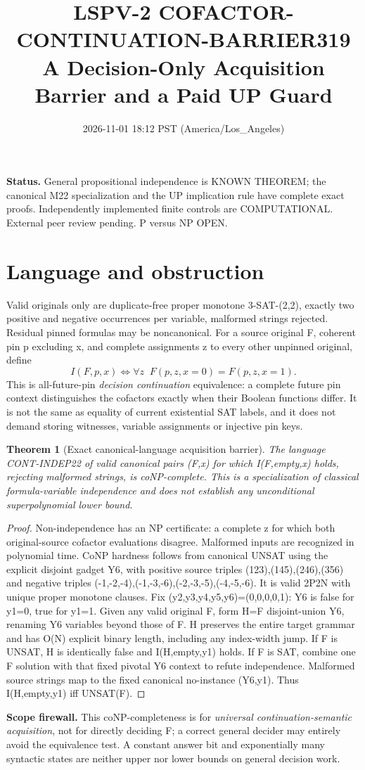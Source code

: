 \documentclass[11pt]{article}
\title{LSPV-2 COFACTOR-CONTINUATION-BARRIER319\\A Decision-Only Acquisition Barrier and a Paid UP Guard}
\date{2026-11-01 18:12 PST (America/Los\_Angeles)}
\newtheorem{theorem}{Theorem}
\begin{document}
\maketitle
\noindent\textbf{Status.} General propositional independence is KNOWN THEOREM; the canonical M22 specialization and the UP implication rule have complete exact proofs. Independently implemented finite controls are COMPUTATIONAL. External peer review pending. P versus NP OPEN.
\section{Language and obstruction}
Valid originals only are duplicate-free proper monotone 3-SAT-(2,2), exactly two positive and negative occurrences per variable, malformed strings rejected. Residual pinned formulas may be noncanonical. For a source original F, coherent pin p excluding x, and complete assignments z to every other unpinned original, define
\[
I(F,p,x)\Longleftrightarrow\forall z\;\;F(p,z,x=0)=F(p,z,x=1).
\]
This is all-future-pin \emph{decision continuation} equivalence: a complete future pin context distinguishes the cofactors exactly when their Boolean functions differ. It is not the same as equality of current existential SAT labels, and it does not demand storing witnesses, variable assignments or injective pin keys.
\begin{theorem}[Exact canonical-language acquisition barrier]
The language CONT-INDEP22 of valid canonical pairs (F,x) for which I(F,empty,x) holds, rejecting malformed strings, is coNP-complete. This is a specialization of classical formula-variable independence and does not establish any unconditional superpolynomial lower bound.
\end{theorem}
\begin{proof}
Non-independence has an NP certificate: a complete z for which both original-source cofactor evaluations disagree. Malformed inputs are recognized in polynomial time. CoNP hardness follows from canonical UNSAT using the explicit disjoint gadget Y6, with positive source triples (123),(145),(246),(356) and negative triples (-1,-2,-4),(-1,-3,-6),(-2,-3,-5),(-4,-5,-6). It is valid 2P2N with unique proper monotone clauses. Fix (y2,y3,y4,y5,y6)=(0,0,0,0,1): Y6 is false for y1=0, true for y1=1. Given any valid original F, form H=F disjoint-union Y6, renaming Y6 variables beyond those of F. H preserves the entire target grammar and has O(N) explicit binary length, including any index-width jump. If F is UNSAT, H is identically false and I(H,empty,y1) holds. If F is SAT, combine one F solution with that fixed pivotal Y6 context to refute independence. Malformed source strings map to the fixed canonical no-instance (Y6,y1). Thus I(H,empty,y1) iff UNSAT(F). \end{proof}
\noindent\textbf{Scope firewall.} This coNP-completeness is for \emph{universal continuation-semantic acquisition}, not for directly deciding F; a correct general decider may entirely avoid the equivalence test. A constant answer bit and exponentially many syntactic states are neither upper nor lower bounds on general decision work.
\end{document}
